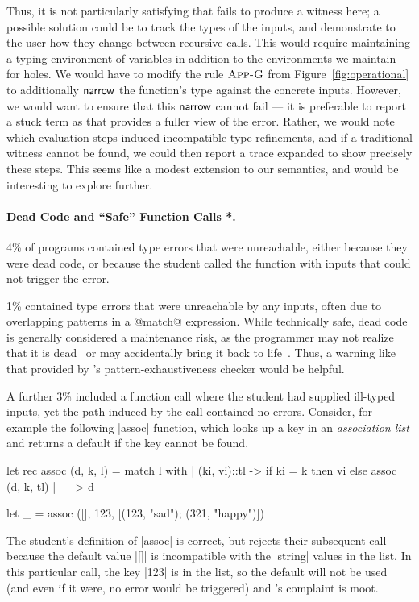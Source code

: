 Thus, it is not particularly satisfying that \toolname fails to produce
a witness here; a possible solution could be to track the types of the
inputs, and demonstrate to the user how they change between recursive
calls.
%
This would require maintaining a typing environment of variables in
addition to the environments we maintain for holes.
%
We would have to modify the rule $\textsc{App-G}$ from
Figure~\ref{fig:operational} to additionally $\mathsf{narrow}$ the function's
type against the concrete inputs.
%
However, we would want to ensure that this $\mathsf{narrow}$ cannot fail ---
it is preferable to report a stuck term as that provides a fuller view
of the error.
%
Rather, we would note which evaluation steps induced incompatible
type refinements, and if a traditional witness cannot be found, we could
then report a trace expanded to show precisely these steps.
%
This seems like a modest extension to our semantics, and would be
interesting to explore further.

\paragraph{Dead Code and ``Safe'' Function Calls *.}
%
4\% of programs contained type errors that were unreachable, either
because they were dead code, or because the student called the function
with inputs that could not trigger the error.


1\% contained type errors that were unreachable by any inputs, often due
to overlapping patterns in a @match@ expression.
%
%
While technically safe, dead code is generally considered a maintenance
risk, as the programmer may not realize that it is dead~\cite{Wheeler2014-fg}
or may accidentally bring it back to life~\cite{Seven2014-gf}.
%
Thus, a warning like that provided by \ocaml's pattern-exhaustiveness
checker would be helpful.

A further 3\% included a function call where the
student had supplied ill-typed inputs, yet the path induced
by the call contained no errors.
%
Consider, for example the following |assoc| function, which
looks up a key in an \emph{association list} and returns a default if
the key cannot be found.
%
\begin{code}
  let rec assoc (d, k, l) = match l with
    | (ki, vi)::tl ->
       if ki = k then
         vi
       else
         assoc (d, k, tl)
    | _ -> d

  let _ = assoc ([], 123, [(123, "sad"); (321, "happy")])
\end{code}
%
The student's definition of |assoc| is correct, but \ocaml rejects their
subsequent call because the default value |[]| is incompatible with the
|string| values in the list.
%
In this particular call, the key |123| is in the list, so the default
will not be used (and even if it were, no error would be triggered) and
\ocaml's complaint is moot.

